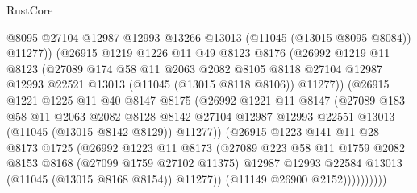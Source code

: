 \begin{lexlean}{RustCore}
\begin{coremodule}
                    @8095
                    @27104
                    @12987
                    @12993
                    @13266
                    @13013
                    (@11045 (@13015 @8095 @8084))
                    @11277))
                (@26915
                  @1219
                  @1226
                  @11
                  @49
                  @8123
                  @8176
                  (@26992
                    @1219
                    @11
                    @8123
                    (@27089
                      @174
                      @58
                      @11
                      @2063
                      @2082
                      @8105
                      @8118
                      @27104
                      @12987
                      @12993
                      @22521
                      @13013
                      (@11045 (@13015 @8118 @8106))
                      @11277))
                  (@26915
                    @1221
                    @1225
                    @11
                    @40
                    @8147
                    @8175
                    (@26992
                      @1221
                      @11
                      @8147
                      (@27089
                        @183
                        @58
                        @11
                        @2063
                        @2082
                        @8128
                        @8142
                        @27104
                        @12987
                        @12993
                        @22551
                        @13013
                        (@11045 (@13015 @8142 @8129))
                        @11277))
                    (@26915
                      @1223
                      @141
                      @11
                      @28
                      @8173
                      @1725
                      (@26992
                        @1223
                        @11
                        @8173
                        (@27089
                          @223
                          @58
                          @11
                          @1759
                          @2082
                          @8153
                          @8168
                          (@27099 @1759 @27102 @11375)
                          @12987
                          @12993
                          @22584
                          @13013
                          (@11045 (@13015 @8168 @8154))
                          @11277))
                      (@11149 @26900 @2152))))))))))

\end{coremodule}
\end{lexlean}
